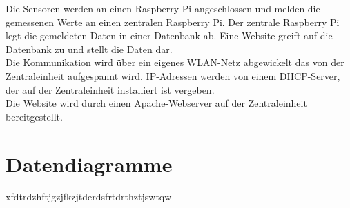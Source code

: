 Die Sensoren werden an einen Raspberry Pi angeschlossen und melden die
gemessenen Werte an einen zentralen Raspberry Pi. Der zentrale Raspberry Pi legt
die gemeldeten Daten in einer Datenbank ab. Eine Website greift auf die
Datenbank zu und stellt die Daten dar.\\
Die Kommunikation wird über ein eigenes WLAN-Netz abgewickelt das von der
Zentraleinheit aufgespannt wird. IP-Adressen werden von einem DHCP-Server, der
auf der Zentraleinheit installiert ist vergeben.\\
Die Website wird durch einen Apache-Webserver auf der Zentraleinheit
bereitgestellt.


\section{Datendiagramme}
xfdtrdzhftjgzjfkzjtderdsfrtdrthztjswtqw
